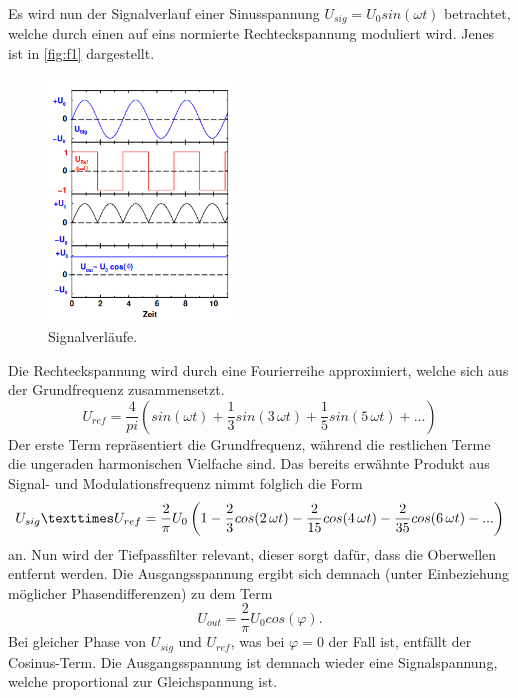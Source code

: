 Es wird nun der Signalverlauf einer Sinusspannung $U_{sig} = U_0 sin (\omega t)$
betrachtet, welche durch einen auf eins normierte Rechteckspannung moduliert 
wird. Jenes ist in \autoref{fig:f1} dargestellt.
\begin{figure}[H]
    \centering
        \centering
        \includegraphics[width=0.45\textwidth]{Bilder/sigs.png}
        \caption{Signalverläufe. \cite{anleitung2}}
    \hfill
    \label{fig:f1}
\end{figure}
\noindent Die Rechteckspannung wird durch eine Fourierreihe approximiert, welche
sich aus der Grundfrequenz zusammensetzt.
\begin{equation}
    U_{ref} = \frac{4}{pi} \left(sin(\omega t) + \frac{1}{3}sin(3 \, \omega t) + \frac{1}{5}sin(5 \, \omega t) + ...\right)
\end{equation}
Der erste Term repräsentiert die Grundfrequenz, während die restlichen Terme 
die ungeraden harmonischen Vielfache sind. Das bereits erwähnte Produkt aus 
Signal- und Modulationsfrequenz nimmt folglich die Form
\begin{equation}
    U_{sig} \texttimes U_{ref} = \frac{2}{\pi} U_0 \left(1- \frac{2}{3}cos(2 \, \omega t) - \frac{2}{15}cos(4 \, \omega t) - \frac{2}{35}cos(6 \, \omega t) - ...\right)
\end{equation}
an. Nun wird der Tiefpassfilter relevant, dieser sorgt dafür, dass die Oberwellen 
entfernt werden. Die Ausgangsspannung ergibt sich demnach (unter Einbeziehung 
möglicher Phasendifferenzen) zu dem Term
\begin{equation}
    \label{eqn:4}
    U_{out} = \frac{2}{\pi} U_0 cos(\varphi).
\end{equation}
Bei gleicher Phase von $U_{sig}$ und $U_{ref}$, was bei $\varphi = 0$ der Fall
ist, entfällt der Cosinus-Term. Die Ausgangsspannung ist demnach wieder eine 
Signalspannung, welche proportional zur Gleichspannung ist.


